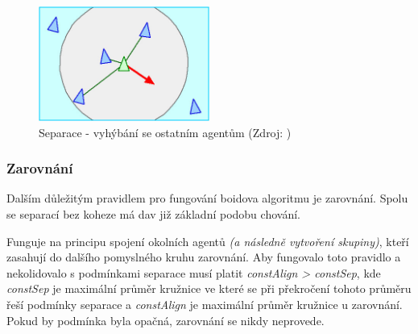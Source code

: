 \documentclass[czech,public,dept460,male,cpdeclaration]{diploma}
\begin{document}
\begin{figure}[H]\centering\includegraphics[width=0.5\textwidth]{Figures/separation.jpg}
	\caption{Separace - vyhýbání se ostatním agentům (Zdroj: \cite{link2})}
\end{figure}

\subsubsection{Zarovnání}
Dalším důležitým pravidlem pro fungování boidova algoritmu je zarovnání. Spolu se separací bez koheze má dav již základní podobu chování. 

Funguje na principu spojení okolních agentů \textit{(a následně vytvoření skupiny)}, kteří zasahují do dalšího pomyslného kruhu zarovnání. Aby fungovalo toto pravidlo a nekolidovalo s podmínkami separace musí platit \textit{constAlign > constSep}, kde \textit{constSep} je maximální průměr kružnice ve které se při překročení tohoto průměru řeší podmínky separace a \textit{constAlign} je maximální průměr kružnice u zarovnání. Pokud by podmínka byla opačná, zarovnání se nikdy neprovede.





\end{document}
